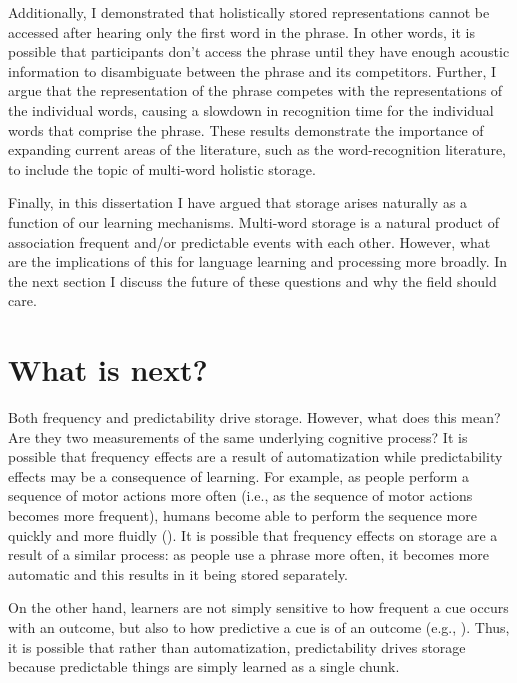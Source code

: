 \documentclass[
  12pt,
  letterpaper,
]{scrreport}
\begin{document}
Additionally, I demonstrated that holistically stored representations
cannot be accessed after hearing only the first word in the phrase. In
other words, it is possible that participants don't access the phrase
until they have enough acoustic information to disambiguate between the
phrase and its competitors. Further, I argue that the representation of
the phrase competes with the representations of the individual words,
causing a slowdown in recognition time for the individual words that
comprise the phrase. These results demonstrate the importance of
expanding current areas of the literature, such as the word-recognition
literature, to include the topic of multi-word holistic storage.

Finally, in this dissertation I have argued that storage arises
naturally as a function of our learning mechanisms. Multi-word storage
is a natural product of association frequent and/or predictable events
with each other. However, what are the implications of this for language
learning and processing more broadly. In the next section I discuss the
future of these questions and why the field should care.

\section{What is next?}\label{what-is-next}

Both frequency and predictability drive storage. However, what does this
mean? Are they two measurements of the same underlying cognitive
process? It is possible that frequency effects are a result of
automatization while predictability effects may be a consequence of
learning. For example, as people perform a sequence of motor actions
more often (i.e., as the sequence of motor actions becomes more
frequent), humans become able to perform the sequence more quickly and
more fluidly (). It is possible that frequency effects on storage are a result of
a similar process: as people use a phrase more often, it becomes more
automatic and this results in it being stored separately.

On the other hand, learners are not simply sensitive to how frequent a
cue occurs with an outcome, but also to how predictive a cue is of an
outcome (e.g.,
). Thus, it is possible that rather than automatization,
predictability drives storage because predictable things are simply
learned as a single chunk.
\end{document}
